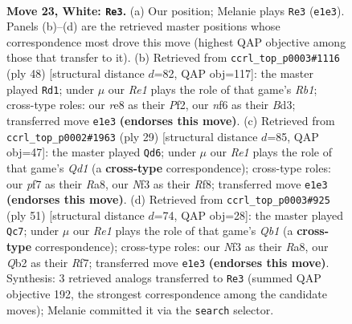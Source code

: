 \documentclass[11pt]{article}
\begin{document}
\clearpage

\begin{figure}[p]\centering
\begin{subfigure}{0.46\textwidth}\centering
\resizebox{\linewidth}{!}{%
\newchessgame
\chessboard[
  setfen={rnbqr2k/5p2/1p2pnp1/7p/p1PP4/B2B1NPP/PQ3P2/3RR1K1 w - - 1 23},
  showmover=false,
  pgfstyle=straightmove, color=movearrow, markmove={e1-e3}
]}
\caption{}
\end{subfigure}\hfill
\begin{subfigure}{0.46\textwidth}\centering
\resizebox{\linewidth}{!}{%
\newchessgame
\chessboard[
  setfen={2rrb1k1/p1q2pp1/Pp2pn1p/8/2PP4/3BQN1P/5PP1/RR4K1 w - - 1 25},
  showmover=false,
  pgfstyle=straightmove, color=movearrow, markmove={b1-d1}
]}
\caption{}
\end{subfigure}
\\[4pt]
\begin{subfigure}{0.46\textwidth}\centering
\resizebox{\linewidth}{!}{%
\newchessgame
\chessboard[
  setfen={r2q1rk1/p1n1p1bp/2p5/1pp2p1b/P4P2/3P3P/1PPNN1PK/R1B1QR2 b - - 1 15},
  showmover=false,
  pgfstyle=straightmove, color=movearrow, markmove={d8-d6}
]}
\caption{}
\end{subfigure}\hfill
\begin{subfigure}{0.46\textwidth}\centering
\resizebox{\linewidth}{!}{%
\newchessgame
\chessboard[
  setfen={rq4k1/3p1rp1/p1n1p2p/4P1p1/Pb6/2N2P1P/1P2RBP1/2RQ3K b - - 1 26},
  showmover=false,
  pgfstyle=straightmove, color=movearrow, markmove={b8-c7}
]}
\caption{}
\end{subfigure}
\caption{\textbf{Move 23, White: \texttt{Re3}.} (a) Our position; Melanie plays \texttt{Re3} (\texttt{e1e3}). Panels (b)--(d) are the retrieved master positions whose correspondence most drove this move (highest QAP objective among those that transfer to it). (b) Retrieved from \texttt{ccrl\_top\_p0003\#1116} (ply 48) [structural distance $d$=82, QAP obj=117]: the master played \texttt{Rd1}; under $\mu$ our \emph{Re1} plays the role of that game's \emph{Rb1}; cross-type roles: our \emph{r}e8 as their \emph{P}f2, our \emph{n}f6 as their \emph{B}d3; transferred move \texttt{e1e3} \textbf{(endorses this move)}. (c) Retrieved from \texttt{ccrl\_top\_p0002\#1963} (ply 29) [structural distance $d$=85, QAP obj=47]: the master played \texttt{Qd6}; under $\mu$ our \emph{Re1} plays the role of that game's \emph{Qd1} (a \textbf{cross-type} correspondence); cross-type roles: our \emph{p}f7 as their \emph{R}a8, our \emph{N}f3 as their \emph{R}f8; transferred move \texttt{e1e3} \textbf{(endorses this move)}. (d) Retrieved from \texttt{ccrl\_top\_p0003\#925} (ply 51) [structural distance $d$=74, QAP obj=28]: the master played \texttt{Qc7}; under $\mu$ our \emph{Re1} plays the role of that game's \emph{Qb1} (a \textbf{cross-type} correspondence); cross-type roles: our \emph{N}f3 as their \emph{R}a8, our \emph{Q}b2 as their \emph{R}f7; transferred move \texttt{e1e3} \textbf{(endorses this move)}. Synthesis: 3 retrieved analogs transferred to \texttt{Re3} (summed QAP objective 192, the strongest correspondence among the candidate moves); Melanie committed it via the \texttt{search} selector.}
\label{fig:thought-m44}
\end{figure}
\end{document}
